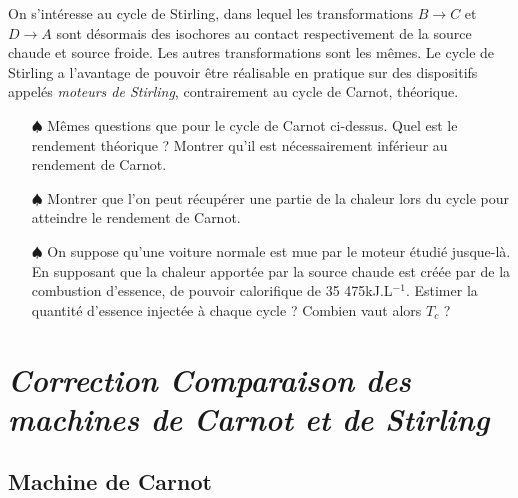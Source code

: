 \documentclass{report}
\begin{document}
On s'intéresse au cycle de Stirling, dans lequel les transformations $B \rightarrow C$ et $D \rightarrow A$ sont désormais des isochores au contact respectivement de la source chaude et source froide. Les autres transformations sont les mêmes. Le cycle de Stirling a l'avantage de pouvoir être réalisable en pratique sur des dispositifs appelés \textit{moteurs de Stirling}, contrairement au cycle de Carnot, théorique.

\begin{itemize}

	\item[$\spadesuit$] Mêmes questions que pour le cycle de Carnot ci-dessus. Quel est le rendement théorique ? Montrer qu'il est nécessairement inférieur au rendement de Carnot.
	
	\item[$\spadesuit$]	 Montrer que l'on peut récupérer une partie de la chaleur lors du cycle pour atteindre le rendement de Carnot.
	
	\item[$\spadesuit$] On suppose qu'une voiture normale est mue par le moteur étudié jusque-là. En supposant que la chaleur apportée par la source chaude est créée par de la combustion d'essence, de pouvoir calorifique de 35 475kJ.L$^{-1}$. Estimer la quantité d'essence injectée à chaque cycle ? Combien vaut alors $T_c$ ?
	
\end{itemize}

\newpage

\section*{\textit{Correction Comparaison des machines de Carnot et de Stirling}}

\subsection*{Machine de Carnot}
\end{document}
